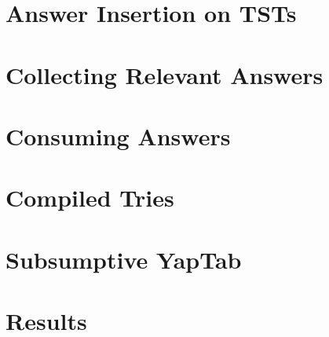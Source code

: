 \section{Answer Insertion on TSTs}

\section{Collecting Relevant Answers}

\section{Consuming Answers}

\section{Compiled Tries}

\section{Subsumptive YapTab}

\section{Results}